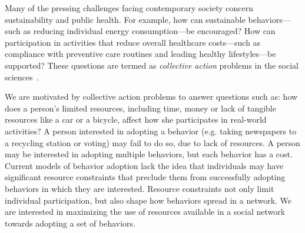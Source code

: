 \documentclass[letterpaper]{article}
\theoremstyle{plain} 		\newtheorem{thm}{Theorem}[section]
\theoremstyle{definition} 	\newtheorem{defn}[thm]{Definition}
\theoremstyle{remark}		\newtheorem{rem}{Remark}
\begin{document}
Many of the pressing challenges facing contemporary society concern sustainability and public health. For example, how can sustainable behaviors---such as reducing individual energy consumption---be encouraged? How can participation in activities that reduce overall healthcare costs---such as compliance with preventive care routines and leading healthy lifestyles---be supported? These questions are termed as \textit{collective action} problems in the social sciences~\cite{Ostrom1999}. 

We are motivated by collective action problems to answer questions such as: how does a person's limited resources, including time, money or lack of tangible resources like a car or a bicycle, affect how she participates in real-world activities? A person interested in adopting a behavior (e.g. taking newspapers to a recycling station or voting) may fail to do so, due to
lack of resources.  A person may be interested in adopting multiple behaviors,
but each behavior has a cost. Current models of behavior adoption lack the idea that individuals may have significant resource constraints that preclude them from successfully adopting behaviors in which they are interested. Resource constraints not only limit individual participation, but also shape how behaviors spread in a network. We are interested in maximizing the use of resources available in a social network towards adopting a set of behaviors.

\end{document}
